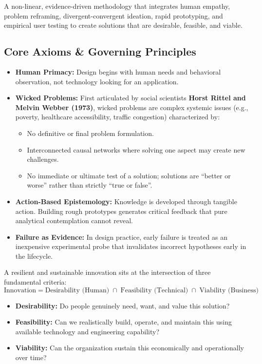 \begin{definition}
A non-linear, evidence-driven methodology that integrates human empathy, problem reframing, divergent-convergent ideation, rapid prototyping, and empirical user testing to create solutions that are desirable, feasible, and viable.
\end{definition}

\subsection{Core Axioms \& Governing Principles}
\begin{itemize}[leftmargin=1.2em, itemsep=3pt]
    \item \textbf{Human Primacy:} Design begins with human needs and behavioral observation, not technology looking for an application.
    \item \textbf{Wicked Problems:} First articulated by social scientists \textbf{Horst Rittel and Melvin Webber (1973)}, wicked problems are complex systemic issues (e.g., poverty, healthcare accessibility, traffic congestion) characterized by:
    \begin{itemize}
        \item No definitive or final problem formulation.
        \item Interconnected causal networks where solving one aspect may create new challenges.
        \item No immediate or ultimate test of a solution; solutions are ``better or worse'' rather than strictly ``true or false''.
    \end{itemize}
    \item \textbf{Action-Based Epistemology:} Knowledge is developed through tangible action. Building rough prototypes generates critical feedback that pure analytical contemplation cannot reveal.
    \item \textbf{Failure as Evidence:} In design practice, early failure is treated as an inexpensive experimental probe that invalidates incorrect hypotheses early in the lifecycle.
\end{itemize}

\begin{keyequation}
A resilient and sustainable innovation sits at the intersection of three fundamental criteria:
\begin{equation}
\text{Innovation} = \text{Desirability (Human)} \;\cap\; \text{Feasibility (Technical)} \;\cap\; \text{Viability (Business)}
\end{equation}
\begin{itemize}[leftmargin=1.2em, itemsep=2pt]
    \item \textbf{Desirability:} Do people genuinely need, want, and value this solution?
    \item \textbf{Feasibility:} Can we realistically build, operate, and maintain this using available technology and engineering capability?
    \item \textbf{Viability:} Can the organization sustain this economically and operationally over time?
\end{itemize}
\end{keyequation}


